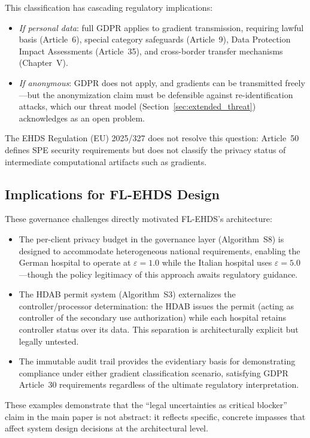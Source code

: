 \documentclass[conference]{IEEEtran}
\begin{document}
This classification has cascading regulatory implications:
\begin{itemize}
    \item \textit{If personal data}: full GDPR applies to gradient transmission, requiring lawful basis (Article~6), special category safeguards (Article~9), Data Protection Impact Assessments (Article~35), and cross-border transfer mechanisms (Chapter~V).
    \item \textit{If anonymous}: GDPR does not apply, and gradients can be transmitted freely---but the anonymization claim must be defensible against re-identification attacks, which our threat model (Section~\ref{sec:extended_threat}) acknowledges as an open problem.
\end{itemize}

The EHDS Regulation (EU) 2025/327 does not resolve this question: Article~50 defines SPE security requirements but does not classify the privacy status of intermediate computational artifacts such as gradients.

\subsection{Implications for FL-EHDS Design}

These governance challenges directly motivated FL-EHDS's architecture:
\begin{itemize}
    \item The per-client privacy budget in the governance layer (Algorithm~S8) is designed to accommodate heterogeneous national requirements, enabling the German hospital to operate at $\varepsilon = 1.0$ while the Italian hospital uses $\varepsilon = 5.0$---though the policy legitimacy of this approach awaits regulatory guidance.
    \item The HDAB permit system (Algorithm~S3) externalizes the controller/processor determination: the HDAB issues the permit (acting as controller of the secondary use authorization) while each hospital retains controller status over its data. This separation is architecturally explicit but legally untested.
    \item The immutable audit trail provides the evidentiary basis for demonstrating compliance under either gradient classification scenario, satisfying GDPR Article~30 requirements regardless of the ultimate regulatory interpretation.
\end{itemize}

These examples demonstrate that the ``legal uncertainties as critical blocker'' claim in the main paper is not abstract: it reflects specific, concrete impasses that affect system design decisions at the architectural level.
\end{document}
